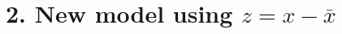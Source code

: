 \documentclass{article}
\begin{document}
\section*{2. New model using $z = x - \bar{x}$}
\end{document}
